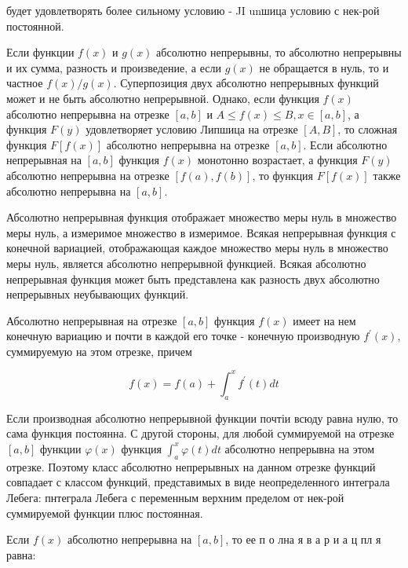 \documentclass[10pt]{article}
\begin{document}
будет удовлетворять более сильному условию - JI unшица условию с нек-рой постоянной.



Если функции $f(x)$ и $g(x)$ абсолютно непрерывны, то абсолютно непрерывны и их сумма, разность и произведение, а если $g(x)$ не обращается в нуль, то и частное $f(x) / g(x)$. Суперпозиция двух абсолютно непрерывных функций может и не быть абсолютно непрерывной. Однако, если функция $f(x)$ абсолютно непрерывна на отрезке $[a, b]$ и $A \leqslant f(x) \leqslant B, x \in[a, b]$, а функция $F(y)$ удовлетворяет условию Липшица на отрезке $[A, B]$, то сложная функция $F[f(x)]$ абсолютно непрерывна на отрезке $[a, b]$. Если абсолютно непрерывная на $[a, b]$ функция $f(x)$ монотонно возрастает, а функция $F(y)$ абсолютно непрерывна на отрезке $[f(a), f(b)]$, то функция $F[f(x)]$ также абсолютно непрерывна на $[a, b]$.



Абсолютно непрерывная функция отображает множество меры нуль в множество меры нуль, а измеримое множество в измеримое. Всякая непрерывная функция с конечной вариацией, отображающая каждое множество меры нуль в множество меры нуль, является абсолютно непрерывной функцией. Всякая абсолютно непрерывная функция может быть представлена как разность двух абсолютно непрерывных неубывающих функций.



Абсолютно непрерывная на отрезке $[a, b]$ функция $f(x)$ имеет на нем конечную вариацию и почти в каждой его точке - конечную производную $f^{\prime}(x)$, суммируемую на этом отрезке, причем



\[

f(x)=f(a)+\int_{a}^{x} f^{\prime}(t) d t

\]



Если производная абсолютно непрерывной функции почтіи всюду равна нулю, то сама функция постоянна. С другой стороны, для любой суммируемой на отрезке $[a, b]$ функции $\varphi(x)$ функция $\int_{a}^{x} \varphi(t) d t$ абсолютно непрерывна на этом отрезке. Поэтому класс абсолютно непрерывных на данном отрезке функций совпадает с классом функций, представимых в виде неопределенного интеграла Лебега: пнтеграла Лебега с переменным верхним пределом от нек-рой суммируемой функции плюс постоянная.



Если $f(x)$ абсолютно непрерывна на $[a, b]$, то ее п о лна я в а р и а ц пл я равна:
\end{document}
